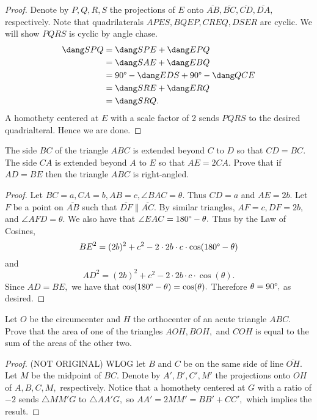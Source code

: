 \documentclass[letterpaper,oneside]{scrartcl}
\providecommand{\ol}{\overline}
\begin{document}
\begin{proof}
  Denote by $P,Q,R,S$ the projections of $E$ onto $\ol{AB},\ol{BC},\ol{CD},\ol{DA},$ respectively. Note that quadrilaterals $APES, BQEP, CREQ, DSER$ are cyclic. We will show $PQRS$ is cyclic by angle chase.
  \begin{align*}
    \dang SPQ &= \dang SPE + \dang EPQ \\
    &= \dang SAE + \dang EBQ \\
    &= 90\degree - \dang EDS + 90\degree - \dang QCE \\
    &= \dang SRE + \dang ERQ \\
    &= \dang SRQ.
  \end{align*}
  A homothety centered at $E$ with a scale factor of 2 sends $PQRS$ to the desired quadrialteral. Hence we are done. 
\end{proof}

\begin{problem*}
  [3.26 (EGMO 2013/1)]
  The side $BC$ of the triangle $ABC$ is extended beyond $C$ to $D$ so that $CD=BC$. The side $CA$ is extended beyond $A$ to $E$ so that $AE=2CA$. Prove that if $AD=BE$ then the triangle $ABC$ is right-angled.
\end{problem*}

\begin{proof}
  Let $BC=a, CA=b, AB=c,\angle BAC = \theta.$ Thus $CD = a$ and $AE = 2b.$ Let $F$ be a point on $\ol{AB}$ such that $\ol{DF} \parallel \ol{AC}.$ By similar triangles, $AF=c, DF = 2b,$ and $\angle AFD = \theta.$ We also have that $\angle EAC = 180\degree - \theta.$ Thus by the Law of Cosines, 
  $${BE}^2 = (2b)^2+c^2-2\cdot 2b \cdot c\cdot\cos(180\degree - \theta)$$ and $${AD}^2 = (2b)^2+c^2-2\cdot 2b \cdot c\cdot\cos(\theta).$$
  Since $AD = BE,$ we have that $\cos(180\degree - \theta) = \cos(\theta).$ Therefore $\theta = 90\degree,$ as desired. 
\end{proof}

\begin{problem*}
  [3.27 (APMO 2004/2)]
  Let $O$ be the circumcenter and $H$ the orthocenter of an acute triangle $ABC$. Prove that the area of one of the triangles $AOH, BOH,$ and $COH$ is equal to the sum of the areas of the other two.
\end{problem*}
\begin{proof}
  (NOT ORIGINAL) WLOG let $B$ and $C$ be on the same side of line $\ol{OH}.$ Let $M$ be the midpoint of $BC.$ Denote by $A',B',C',M'$ the projections onto $OH$ of $A,B,C,M,$ respectively. Notice that a homothety centered at $G$ with a ratio of $-2$ sends $\triangle MM'G$ to $\triangle AA'G,$ so $AA' = 2MM' = BB' + CC',$ which implies the result.  
\end{proof}
\end{document}
